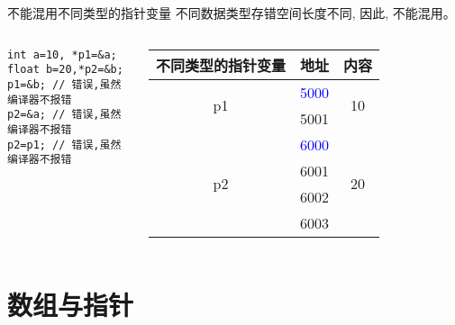 \begin{frame}{不能混用不同类型的指针变量}
不同数据类型存错空间长度不同, 因此, 不能混用。
\begin{columns}[T]
\begin{lstlisting}
int a=10, *p1=&a;
float b=20,*p2=&b;
p1=&b; // 错误,虽然编译器不报错
p2=&a; // 错误,虽然编译器不报错
p2=p1; // 错误,虽然编译器不报错
\end{lstlisting}
\begin{tabular}{|c|c|c|}
	\hline 
	\scriptsize{不同类型的指针变量} & \textbf{地址} & \textbf{内容} \\ 
	\hline 
	\multirow{2}{*}{p1} & \textcolor{blue}{5000} & \multirow{2}{*}{10} \\ \cline{2-2}  
	& 5001 &  \\ 
	\hline 
	\multirow{4}{*}{p2} & \textcolor{blue}{6000} & \multirow{4}{*}{20} \\ \cline{2-2}  
	& 6001 &  \\ \cline{2-2}  
	& 6002 &  \\ \cline{2-2}
	& 6003 &  \\ 
	\hline 
\end{tabular}
\end{columns}
\end{frame}

\section{数组与指针}


